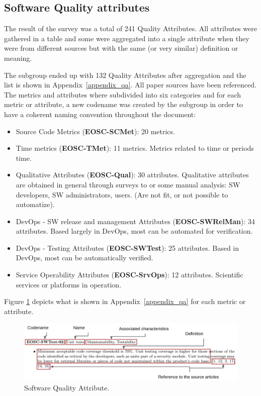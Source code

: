 \subsection{Software Quality attributes}
\label{subsec:SW_quality_attributes}

The result of the survey was a total of 241 Quality Attributes. All attributes were gathered in a table and some were aggregated into a single attribute when they were from different sources but with the same (or very similar) definition or meaning.

The subgroup ended up with 132 Quality Attributes after aggregation and the list is shown in Appendix~\ref{appendix_qa}. All paper sources have been referenced. The metrics and attributes where subdivided into six categories and for each metric or attribute, a new codename was created by the subgroup in order to have a coherent naming convention throughout the document:

\begin{itemize}
    \item Source Code Metrics (\textbf{EOSC-SCMet}): 20 metrics.
    \item Time metrics (\textbf{EOSC-TMet}): 11 metrics. Metrics related to time or periods time.
    \item Qualitative Attributes (\textbf{EOSC-Qual}): 30 attributes. Qualitative attributes are obtained in general through surveys to or some manual analysis: SW developers, SW administrators, users. (Are not fit, or not possible to automatize).
    \item DevOps - SW release and management Attributes (\textbf{EOSC-SWRelMan}): 34 attributes. Based largely in DevOps, most can be automated for verification.
    \item DevOps - Testing Attributes (\textbf{EOSC-SWTest}): 25 attributes. Based in DevOps, most can be automatically verified.
    \item Service Operability Attributes (\textbf{EOSC-SrvOps}): 12 attributes. Scientific services or platforms in operation.
\end{itemize}

Figure \ref{fig:sqattr} depicts what is shown in Appendix~\ref{appendix_qa} for each metric or attribute.

\begin{figure}[h]
    \centering
    \includegraphics[width=0.99\linewidth]{imgs/qa.png}
    \caption{Software Quality Attribute.}
    \label{fig:sqattr}
\end{figure}

